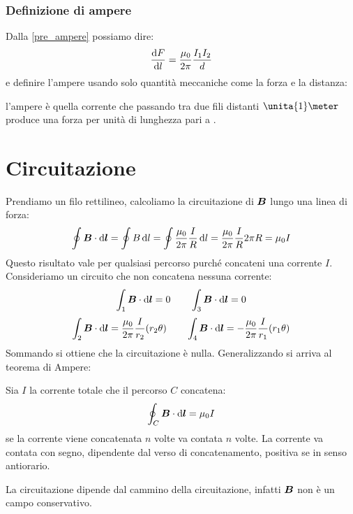 \subsubsection{Definizione di ampere}
Dalla \eqref{pre_ampere} possiamo dire:
\begin{equation}
\frac{\mathrm{d} F}{\mathrm{d} l}=\frac{\mu_0}{2\pi}\frac{I_1I_2}{d}
\end{equation}
e definire l'ampere usando solo quantità meccaniche come la forza e la distanza:
\begin{Def}[ampere]
l'ampere è quella corrente che passando tra due fili distanti $\unita{1}\meter$ produce una forza per unità di lunghezza pari a \newton\per\meter.
\end{Def}

\section{Circuitazione}
Prendiamo un filo rettilineo, calcoliamo la circuitazione di $\boldsymbol{B}$ lungo una linea di forza:
\begin{equation*}\oint\boldsymbol{B}\cdot\mathrm{d}\boldsymbol{l}=\oint B\,\mathrm{d} l=\oint\frac{\mu_0}{2\pi}\frac{I}{R}\,\mathrm{d} l=\frac{\mu_0}{2\pi}\frac{I}{R}2\pi R=\mu_0 I\end{equation*}
Questo risultato vale per qualsiasi percorso purché concateni una corrente $I$. Consideriamo un circuito che non concatena nessuna corrente:
\begin{equation*}\int_1\boldsymbol{B}\cdot\mathrm{d} \boldsymbol{l}=0\qquad\int_3\boldsymbol{B}\cdot\mathrm{d} \boldsymbol{l}=0\end{equation*}
\begin{equation*}\int_2\boldsymbol{B}\cdot\mathrm{d} \boldsymbol{l}=\frac{\mu_0}{2\pi}\frac{I}{r_2}(r_2\theta)\qquad
\int_4\boldsymbol{B}\cdot\mathrm{d} \boldsymbol{l}=-\frac{\mu_0}{2\pi}\frac{I}{r_1}(r_1\theta)\end{equation*}
Sommando si ottiene che la circuitazione è nulla. Generalizzando si arriva al teorema di Ampere:
\begin{Teo}
Sia $I$ la corrente totale che il percorso $C$ concatena:
\begin{equation}
\oint_C \boldsymbol{B}\cdot\mathrm{d} \boldsymbol{l}=\mu_0I
\label{circ_ampere}
\end{equation}
se la corrente viene concatenata $n$ volte va contata $n$ volte. La corrente va contata con segno, dipendente dal verso di concatenamento, positiva se in senso antiorario.
\end{Teo}
La circuitazione dipende dal cammino della circuitazione, infatti $\boldsymbol{B}$ non è un campo conservativo.
